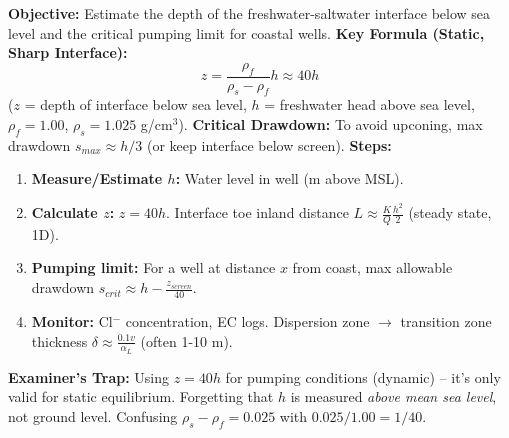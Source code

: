 \documentclass[11pt]{article}
\begin{document}
\begin{methode}
\textbf{Objective:} Estimate the depth of the freshwater-saltwater interface below sea level and the critical pumping limit for coastal wells.
\textbf{Key Formula (Static, Sharp Interface):}
\[ z = \frac{\rho_f}{\rho_s - \rho_f} h \approx 40 h \]
($z$ = depth of interface below sea level, $h$ = freshwater head above sea level, $\rho_f=1.00$, $\rho_s=1.025$ g/cm$^3$).
\textbf{Critical Drawdown:} To avoid upconing, max drawdown $s_{max} \approx h/3$ (or keep interface below screen).
\textbf{Steps:}
\begin{enumerate}
    \item \textbf{Measure/Estimate $h$:} Water level in well (m above MSL).
    \item \textbf{Calculate $z$:} $z = 40 h$. Interface toe inland distance $L \approx \frac{K}{Q} \frac{h^2}{2}$ (steady state, 1D).
    \item \textbf{Pumping limit:} For a well at distance $x$ from coast, max allowable drawdown $s_{crit} \approx h - \frac{z_{screen}}{40}$.
    \item \textbf{Monitor:} Cl$^-$ concentration, EC logs. Dispersion zone $\to$ transition zone thickness $\delta \approx \frac{0.1 v}{\alpha_L}$ (often 1-10 m).
\end{enumerate}
\textbf{Examiner's Trap:} Using $z=40h$ for pumping conditions (dynamic) -- it's only valid for static equilibrium. Forgetting that $h$ is measured \emph{above mean sea level}, not ground level. Confusing $\rho_s - \rho_f = 0.025$ with $0.025/1.00 = 1/40$.
\end{methode}
\end{document}
